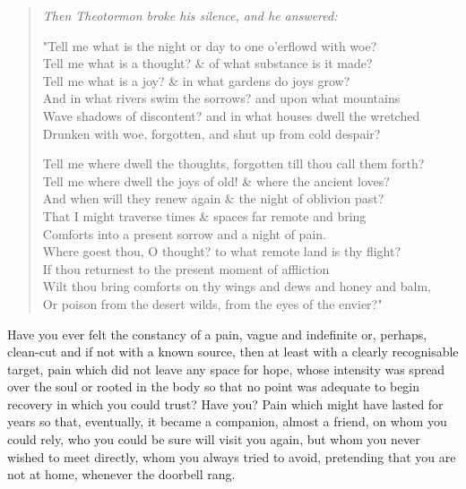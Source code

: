 \begin{verse}{\small{\em
Then Theotormon broke his silence, and he answered:

"Tell me what is the night or day to one o'erflowd with woe?\\
Tell me what is a thought? \& of what substance is it made?\\
Tell me what is a joy? \& in what gardens do joys grow?\\
And in what rivers swim the sorrows? and upon what mountains\\
Wave shadows of discontent? and in what houses dwell the wretched\\
Drunken with woe, forgotten, and shut up from cold despair?

Tell me where dwell the thoughts, forgotten till thou call them 
forth?\\
Tell me where dwell the joys of old! \& where the ancient loves?\\
And when will they renew again \& the night of oblivion past?\\
That I might traverse times \& spaces far remote and bring\\
Comforts into a present sorrow and a night of pain.\\
Where goest thou, O thought? to what remote land is thy flight?\\
If thou returnest to the present moment of affliction\\
Wilt thou bring comforts on thy wings and dews and honey and balm,\\
Or poison from the desert wilds, from the eyes of the 
envier?"
}}
\end{verse}

%

\pa Have you ever felt the constancy of a pain, vague and indefinite
or, perhaps, clean-cut and if not with a known source, then at least
with a clearly recognisable target, pain which did not leave any space
for hope, whose intensity was spread over the soul or rooted in the
body so that no point was adequate to begin recovery in which you
could trust?  Have you? Pain which might have lasted for years so 
that, eventually, it became a companion, almost a friend, on whom you 
could rely, who you could be sure will visit you again, but whom
you never wished to meet directly, whom you always tried 
to avoid, pretending that you are not at home, whenever the doorbell 
rang.


